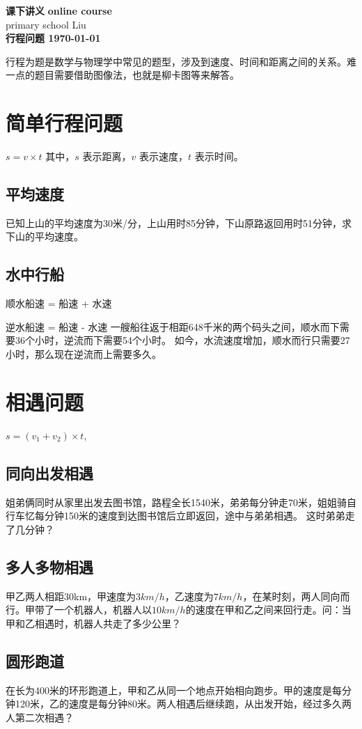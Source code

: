 \documentclass[DIN, pagenumber=false, fontsize=11pt, parskip=half]{scrartcl}
\newcommand{\mytitle}[1]{{\noindent\Large\textbf{#1}}}
\begin{document}
\noindent\textbf{课下讲义} \hfill \textbf{online course}\\
primary school \hfill Liu\\

\mytitle{行程问题 \hfill \today}
\newline
\begin{parchmentquote}
	行程为题是数学与物理学中常见的题型，涉及到速度、时间和距离之间的关系。难一点的题目需要借助图像法，也就是柳卡图等来解答。
\end{parchmentquote}


\section{简单行程问题}
$ s = v \times t $
\newline
其中，\(s\) 表示距离，\(v\) 表示速度，\(t\) 表示时间。
\newline
\subsection{平均速度} 
已知上山的平均速度为30米/分，上山用时85分钟，下山原路返回用时51分钟，求下山的平均速度。

\subsection{水中行船} 
顺水船速 = 船速 + 水速

逆水船速 = 船速 - 水速
\newline
一艘船往返于相距648千米的两个码头之间，顺水而下需要36个小时，逆流而下需要54个小时。
如今，水流速度增加，顺水而行只需要27小时，那么现在逆流而上需要多久。
\section{相遇问题}
$s = (v_1 + v_2) \times t$,
\subsection{同向出发相遇}
姐弟俩同时从家里出发去图书馆，路程全长1540米，弟弟每分钟走70米，姐姐骑自行车忆每分钟150米的速度到达图书馆后立即返回，途中与弟弟相遇。
这时弟弟走了几分钟？
\subsection{多人多物相遇}
甲乙两人相距30km，甲速度为$3km/h$，乙速度为$7km/h$，在某时刻，两人同向而行。甲带了一个机器人，机器人以$10km/h$的速度在甲和乙之间来回行走。问：当甲和乙相遇时，机器人共走了多少公里？
\subsection{圆形跑道}
在长为400米的环形跑道上，甲和乙从同一个地点开始相向跑步。甲的速度是每分钟120米，乙的速度是每分钟80米。两人相遇后继续跑，从出发开始，经过多久两人第二次相遇？
\end{document}
